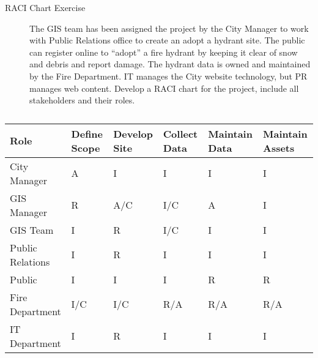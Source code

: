 \documentclass[
  letterpaper,
  DIV=11,
  numbers=noendperiod]{scrartcl}
\begin{document}
\begin{description}
\item[RACI Chart Exercise]
The GIS team has been assigned the project by the City Manager to work
with Public Relations office to create an adopt a hydrant site. The
public can register online to ``adopt'' a fire hydrant by keeping it
clear of snow and debris and report damage. The hydrant data is owned
and maintained by the Fire Department. IT manages the City website
technology, but PR manages web content. Develop a RACI chart for the
project, include all stakeholders and their roles.
\end{description}

\begin{longtable}[t]{l>{\raggedright\arraybackslash}p{2cm}>{\raggedright\arraybackslash}p{2cm}>{\raggedright\arraybackslash}p{2cm}>{\raggedright\arraybackslash}p{2cm}l}

\caption{\label{tbl-raci-exercise}}

\tabularnewline

\toprule
Role & Define Scope & Develop Site & Collect Data & Maintain Data & Maintain Assets\\
\midrule
City Manager & A & I & I & I & I\\
GIS Manager & R & A/C & I/C & A & I\\
GIS Team & I & R & I/C & I & I\\
Public Relations & I & R & I & I & I\\
Public & I & I & I & R & R\\
\addlinespace
Fire Department & I/C & I/C & R/A & R/A & R/A\\
IT Department & I & R & I & I & I\\
\bottomrule

\end{longtable}
\end{document}
